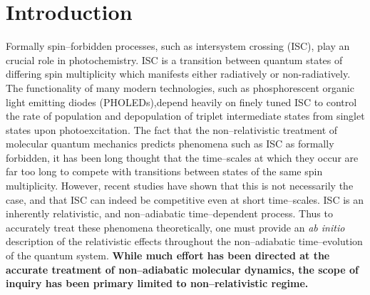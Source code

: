 \section{Introduction}

Formally spin--forbidden processes, such as intersystem crossing (ISC),  play
an crucial role in photochemistry.\cite{Marian_SOC,Scaiano_Photo,Steer93_CR67}
ISC is a transition between quantum states of differing spin multiplicity which
manifests either radiatively or non-radiatively.  The functionality of many
modern technologies, such as phosphorescent organic light emitting diodes
(PHOLEDs),depend heavily on finely tuned ISC to control the rate of population
and depopulation of triplet intermediate states from singlet states upon
photoexcitation\cite{Miyaguchi99_JAP1502}. The fact that the non--relativistic
treatment of molecular quantum mechanics predicts phenomena such as ISC as
formally forbidden, it has been long thought that the time--scales at which
they occur are far too long to compete with transitions between states of the
same spin multiplicity. However, recent studies have shown that this is not
necessarily the case, and that ISC can indeed be competitive even at short
time--scales.\cite{Marian_SOC,Li16_JA2}  ISC is an inherently relativistic, and
non--adiabatic time--dependent process\cite{Dyall07_book,Reiher15_book}.  Thus
to accurately treat these phenomena theoretically, one must provide an \emph{ab
initio} description of the relativistic effects throughout the non--adiabatic
time--evolution of the quantum system.  {\bf While much effort has been
directed at the accurate treatment of non--adiabatic molecular dynamics, the
scope of inquiry has been primary limited to non--relativistic regime.}

